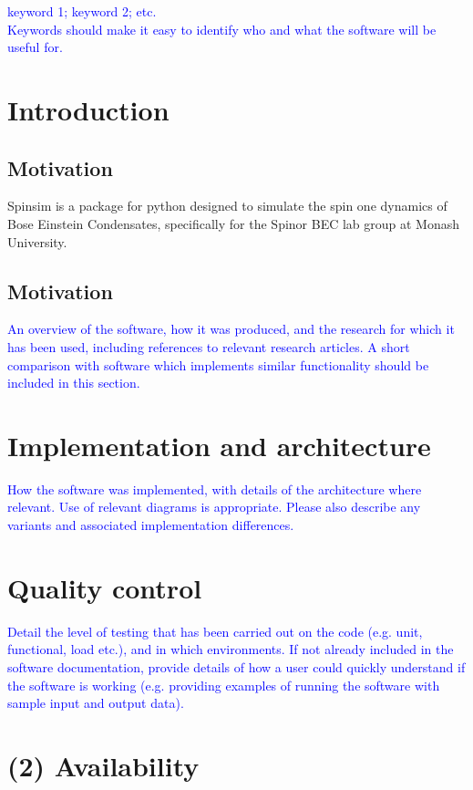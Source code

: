 \documentclass{jors}
\begin{document}
\textcolor{blue}{keyword 1; keyword 2; etc. \\
Keywords should make it easy to identify who and what the software will be useful for.}

\section*{Introduction}
\subsection*{Motivation}
Spinsim is a package for python designed to simulate the spin one dynamics of Bose Einstein Condensates, specifically for the Spinor BEC lab group at Monash University.

\subsection*{Motivation}

\textcolor{blue}{An overview of the software, how it was produced, and the research for which it has been used, including references to relevant research articles. A short comparison with software which implements similar functionality should be included in this section. }

\section*{Implementation and architecture}

\textcolor{blue}{How the software was implemented, with details of the architecture where relevant. Use of relevant diagrams is appropriate. Please also describe any variants and associated implementation differences.}


\section*{Quality control}

\textcolor{blue}{Detail the level of testing that has been carried out on the code (e.g. unit, functional, load etc.), and in which environments. If not already included in the software documentation, provide details of how a user could quickly understand if the software is working (e.g. providing examples of running the software with sample input and output data). }

\section*{(2) Availability}
\vspace{0.5cm}
\end{document}
